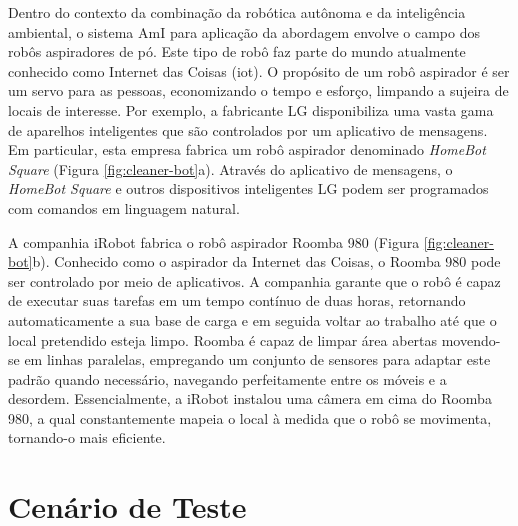 Dentro do contexto da combinação da robótica autônoma e da inteligência ambiental, o sistema AmI para aplicação da abordagem envolve o campo dos robôs aspiradores de pó. Este tipo de robô faz parte do mundo atualmente conhecido como Internet das Coisas (\acrshort{iot}). O propósito de um robô aspirador é ser um servo para as pessoas, economizando o tempo e esforço, limpando a sujeira de locais de interesse. Por exemplo, a fabricante LG disponibiliza uma vasta gama de aparelhos inteligentes que são controlados por um aplicativo de mensagens. Em particular, esta empresa fabrica um robô aspirador denominado \textit{HomeBot Square}  (Figura \ref{fig:cleaner-bot}a). Através do aplicativo de mensagens, o \textit{HomeBot Square} e outros dispositivos inteligentes LG podem ser programados com comandos em linguagem natural.

\begin{figure}[h!]
    \centering
\end{figure}

A companhia iRobot fabrica o robô aspirador Roomba 980 (Figura \ref{fig:cleaner-bot}b). Conhecido como o aspirador da Internet das Coisas, o Roomba 980 pode ser controlado por meio de aplicativos. A companhia garante que o robô é capaz de executar suas tarefas em um tempo contínuo de duas horas, retornando automaticamente a sua base de carga e em seguida voltar ao trabalho até que o local pretendido esteja limpo. Roomba é capaz de limpar área abertas movendo-se em linhas paralelas, empregando um conjunto de sensores para adaptar este padrão quando necessário, navegando perfeitamente entre os móveis e a desordem. Essencialmente, a iRobot instalou uma câmera em cima do Roomba 980, a qual constantemente mapeia o local à medida que o robô se movimenta, tornando-o mais eficiente. 

\section{Cenário de Teste}
\label{sec:cenario-teste}

